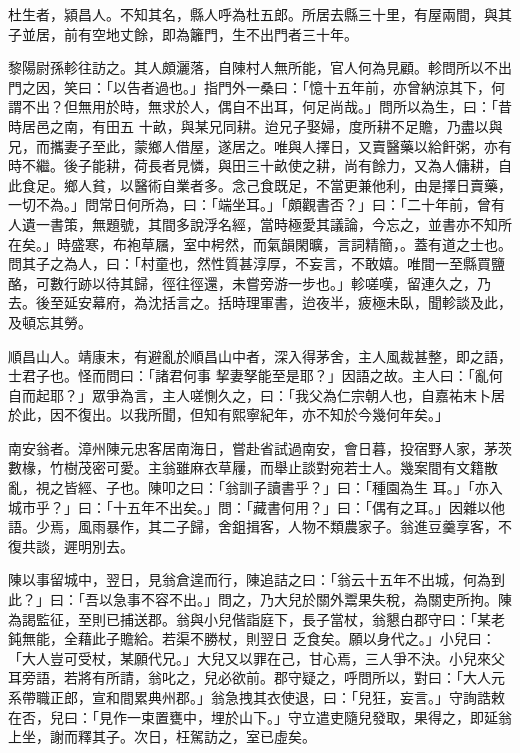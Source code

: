 \begin{pinyinscope}
 杜生者，潁昌人。不知其名，縣人呼為杜五郎。所居去縣三十里，有屋兩間，與其子並居，前有空地丈餘，即為籬門，生不出門者三十年。



 黎陽尉孫軫往訪之。其人頗灑落，自陳村人無所能，官人何為見顧。軫問所以不出門之因，笑曰：「以告者過也。」指門外一桑曰：「憶十五年前，亦曾納涼其下，何謂不出？但無用於時，無求於人，偶自不出耳，何足尚哉。」問所以為生，曰：「昔時居邑之南，有田五
 十畝，與某兄同耕。迨兄子娶婦，度所耕不足贍，乃盡以與兄，而攜妻子至此，蒙鄉人借屋，遂居之。唯與人擇日，又賣醫藥以給飦粥，亦有時不繼。後子能耕，荷長者見憐，與田三十畝使之耕，尚有餘力，又為人傭耕，自此食足。鄉人貧，以醫術自業者多。念己食既足，不當更兼他利，由是擇日賣藥，一切不為。」問常日何所為，曰：「端坐耳。」「頗觀書否？」曰：「二十年前，曾有人遺一書策，無題號，其間多說浮名經，當時極愛其議論，今忘之，並書亦不知所
 在矣。」時盛寒，布袍草屩，室中枵然，而氣韻閑曠，言詞精簡，。蓋有道之士也。問其子之為人，曰：「村童也，然性質甚淳厚，不妄言，不敢嬉。唯間一至縣買鹽酪，可數行跡以待其歸，徑往徑還，未嘗旁游一步也。」軫嗟嘆，留連久之，乃去。後至延安幕府，為沈括言之。括時理軍書，迨夜半，疲極未臥，聞軫談及此，及頓忘其勞。



 順昌山人。靖康末，有避亂於順昌山中者，深入得茅舍，主人風裁甚整，即之語，士君子也。怪而問曰：「諸君何事
 挈妻孥能至是耶？」因語之故。主人曰：「亂何自而起耶？」眾爭為言，主人嗟惻久之，曰：「我父為仁宗朝人也，自嘉祐末卜居於此，因不復出。以我所聞，但知有熙寧紀年，亦不知於今幾何年矣。」



 南安翁者。漳州陳元忠客居南海日，嘗赴省試過南安，會日暮，投宿野人家，茅茨數椽，竹樹茂密可愛。主翁雖麻衣草屨，而舉止談對宛若士人。幾案間有文籍散亂，視之皆經、子也。陳叩之曰：「翁訓子讀書乎？」曰：「種園為生
 耳。」「亦入城市乎？」曰：「十五年不出矣。」問：「藏書何用？」曰：「偶有之耳。」因雜以他語。少焉，風雨暴作，其二子歸，舍鉏揖客，人物不類農家子。翁進豆羹享客，不復共談，遲明別去。



 陳以事留城中，翌日，見翁倉遑而行，陳追詰之曰：「翁云十五年不出城，何為到此？」曰：「吾以急事不容不出。」問之，乃大兒於關外鬻果失稅，為關吏所拘。陳為謁監征，至則已捕送郡。翁與小兒偕詣庭下，長子當杖，翁懇白郡守曰：「某老鈍無能，全藉此子贍給。若渠不勝杖，則翌日
 乏食矣。願以身代之。」小兒曰：「大人豈可受杖，某願代兄。」大兒又以罪在己，甘心焉，三人爭不決。小兒來父耳旁語，若將有所請，翁叱之，兒必欲前。郡守疑之，呼問所以，對曰：「大人元系帶職正郎，宣和間累典州郡。」翁急拽其衣使退，曰：「兒狂，妄言。」守詢誥敕在否，兒曰：「見作一束置甕中，埋於山下。」守立遣吏隨兒發取，果得之，即延翁上坐，謝而釋其子。次日，枉駕訪之，室已虛矣。




\end{pinyinscope}

